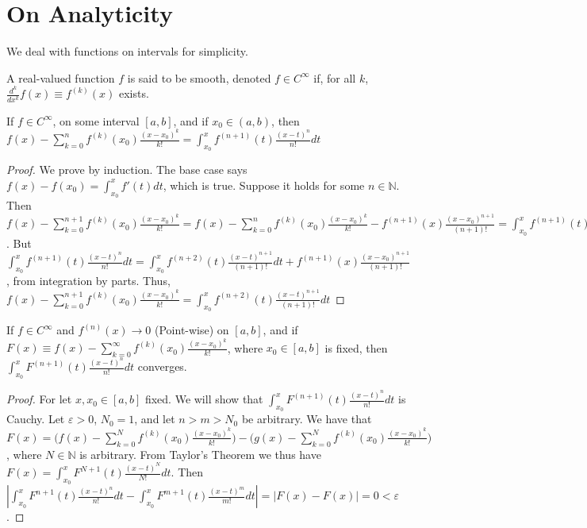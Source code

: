     \section{On Analyticity}
        We deal with functions on intervals for simplicity.
        \begin{definition}
            A real-valued function $f$ is said to be smooth, denoted $f\in C^{\infty}$ if, for all $k$, $\frac{d^k}{dx^k}f(x) \equiv f^{(k)}(x)$ exists.
        \end{definition}
    \begin{theorem}
    If $f\in C^{\infty}$, on some interval $[a,b]$, and if $x_0\in (a,b)$, then $f(x) - \sum_{k=0}^{n} f^{(k)}(x_0)\frac{(x-x_0)^k}{k!} = \int_{x_0}^{x} f^{(n+1)}(t)\frac{(x-t)^n}{n!}dt$
    \end{theorem}
    \begin{proof}
    We prove by induction. The base case says $f(x)-f(x_0) = \int_{x_0}^{x} f'(t)dt$, which is true. Suppose it holds for some $n\in \mathbb{N}$. Then $f(x)-\sum_{k=0}^{n+1} f^{(k)}(x_0)\frac{(x-x_0)^k}{k!} = f(x)-\sum_{k=0}^{n} f^{(k)}(x_0)\frac{(x-x_0)^k}{k!} - f^{(n+1)}(x)\frac{(x-x_0)^{n+1}}{(n+1)!} = \int_{x_0}^{x} f^{(n+1)}(t)\frac{(x-t)^n}{n!}dt - f^{(n+1)}(x)\frac{(x-x_0)^{n+1}}{(n+1)!}$. But $\int_{x_0}^{x} f^{(n+1)}(t)\frac{(x-t)^n}{n!}dt =  \int_{x_0}^{x} f^{(n+2)}(t) \frac{(x-t)^{n+1}}{(n+1)!} dt + f^{(n+1)}(x)\frac{(x-x_0)^{n+1}}{(n+1)!}$, from integration by parts. Thus, $f(x)-\sum_{k=0}^{n+1} f^{(k)}(x_0)\frac{(x-x_0)^k}{k!}= \int_{x_0}^{x} f^{(n+2)}(t) \frac{(x-t)^{n+1}}{(n+1)!} dt$
    \end{proof}
    \begin{theorem}
    If $f\in C^{\infty}$ and $f^{(n)}(x)\rightarrow 0$ (Point-wise) on $[a,b]$, and if $F(x) \equiv f(x)-\sum_{k=0}^{\infty} f^{(k)}(x_0)\frac{(x-x_0)^{k}}{k!}$, where $x_0\in [a,b]$ is fixed, then $\int_{x_0}^{x} F^{(n+1)}(t)\frac{(x-t)^{n}}{n!}dt$ converges. 
    \end{theorem}
    \begin{proof}
    For let $x,x_0\in [a,b]$ fixed. We will show that $\int_{x_0}^{x} F^{(n+1)}(t)\frac{(x-t)^{n}}{n!}dt$ is Cauchy. Let $\varepsilon>0$, $N_0 = 1$, and let $n>m>N_0$ be arbitrary. We have that $F(x) = \bigg(f(x)-\sum_{k=0}^{N} f^{(k)}(x_0)\frac{(x-x_0)^{k}}{k!}\bigg)-\bigg(g(x)-\sum_{k=0}^{N} f^{(k)}(x_0)\frac{(x-x_0)^{k}}{k!}\bigg)$, where $N\in \mathbb{N}$ is arbitrary. From Taylor's Theorem we thus have $F(x) = \int_{x_0}^{x}F^{N+1}(t)\frac{(x-t)^N}{N!}dt$. Then $|\int_{x_0}^{x}F^{n+1}(t)\frac{(x-t)^n}{n!}dt-\int_{x_0}^{x}F^{m+1}(t)\frac{(x-t)^m}{m!}dt| = |F(x)-F(x)|= 0 <\varepsilon$. 
    \end{proof}
